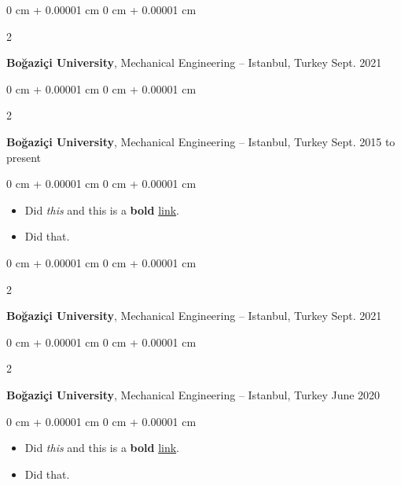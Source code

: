 \documentclass[10pt, letterpaper]{article}
\newenvironment{highlights}{
    \begin{itemize}[
        topsep=0.10 cm,
        parsep=0.10 cm,
        partopsep=0pt,
        itemsep=0pt,
        leftmargin=0 cm + 10pt
    ]
}{
    \end{itemize}
        
    \vspace{-0.10cm}
} %
\newenvironment{onecolentry}{
    \begin{adjustwidth}{
        0 cm + 0.00001 cm
    }{
        0 cm + 0.00001 cm
    }
}{
    \end{adjustwidth}
} %
\newenvironment{twocolentry}[2][]{
    \onecolentry
    \def\secondColumn{#2}
    \setcolumnwidth{\fill, 4.1 cm}
    \begin{paracol}{2}
}{
    \switchcolumn \raggedleft \secondColumn
    \end{paracol}
    \endonecolentry
} %
\begin{document}
        \vspace{0.10 cm}


        \vspace{0.15 cm}

        \begin{twocolentry}{
            Sept. 2021
        }
            \textbf{Boğaziçi University}, Mechanical Engineering -- Istanbul, Turkey\end{twocolentry}

        \vspace{0.10 cm}


        \vspace{0.15 cm}

        \begin{twocolentry}{
            Sept. 2015 to present
        }
            \textbf{Boğaziçi University}, Mechanical Engineering -- Istanbul, Turkey\end{twocolentry}

        \vspace{0.10 cm}
        \begin{onecolentry}
            \begin{highlights}
                \item Did \textit{this} and this is a \textbf{bold} \href{https://example.com}{link}.
                \item Did that.
            \end{highlights}
        \end{onecolentry}


        \vspace{0.15 cm}

        \begin{twocolentry}{
            Sept. 2021
        }
            \textbf{Boğaziçi University}, Mechanical Engineering -- Istanbul, Turkey\end{twocolentry}

        \vspace{0.10 cm}


        \vspace{0.15 cm}

        \begin{twocolentry}{
            June 2020
        }
            \textbf{Boğaziçi University}, Mechanical Engineering -- Istanbul, Turkey\end{twocolentry}

        \vspace{0.10 cm}
        \begin{onecolentry}
            \begin{highlights}
                \item Did \textit{this} and this is a \textbf{bold} \href{https://example.com}{link}.
                \item Did that.
            \end{highlights}
        \end{onecolentry}
\end{document}
